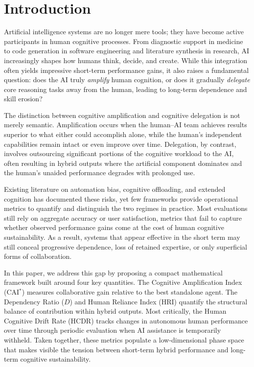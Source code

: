 \documentclass[11pt,a4paper]{article}
\begin{document}
\section{Introduction}

Artificial intelligence systems are no longer mere tools; they have become active participants in human cognitive processes. From diagnostic support in medicine to code generation in software engineering and literature synthesis in research, AI increasingly shapes how humans think, decide, and create. While this integration often yields impressive short-term performance gains, it also raises a fundamental question: does the AI truly \emph{amplify} human cognition, or does it gradually \emph{delegate} core reasoning tasks away from the human, leading to long-term dependence and skill erosion?

The distinction between cognitive amplification and cognitive delegation is not merely semantic. Amplification occurs when the human--AI team achieves results superior to what either could accomplish alone, while the human's independent capabilities remain intact or even improve over time. Delegation, by contrast, involves outsourcing significant portions of the cognitive workload to the AI, often resulting in hybrid outputs where the artificial component dominates and the human's unaided performance degrades with prolonged use.

Existing literature on automation bias, cognitive offloading, and extended cognition has documented these risks, yet few frameworks provide operational metrics to quantify and distinguish the two regimes in practice. Most evaluations still rely on aggregate accuracy or user satisfaction, metrics that fail to capture whether observed performance gains come at the cost of human cognitive sustainability. As a result, systems that appear effective in the short term may still conceal progressive dependence, loss of retained expertise, or only superficial forms of collaboration.

In this paper, we address this gap by proposing a compact mathematical framework built around four key quantities. The Cognitive Amplification Index (CAI$^*$) measures collaborative gain relative to the best standalone agent. The Dependency Ratio ($D$) and Human Reliance Index (HRI) quantify the structural balance of contribution within hybrid outputs. Most critically, the Human Cognitive Drift Rate (HCDR) tracks changes in autonomous human performance over time through periodic evaluation when AI assistance is temporarily withheld. Taken together, these metrics populate a low-dimensional phase space that makes visible the tension between short-term hybrid performance and long-term cognitive sustainability.
\end{document}
